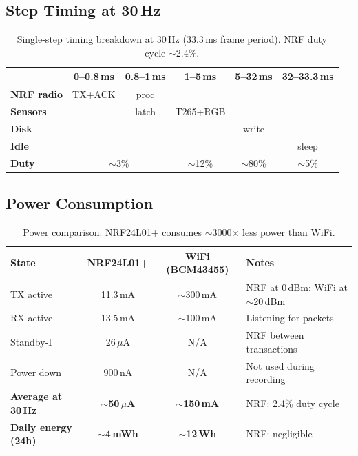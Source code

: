 \documentclass[11pt,a4paper]{article}
\begin{document}
\subsection{Step Timing at 30\,Hz}

\begin{table}[htbp]
\centering
\caption{Single-step timing breakdown at 30\,Hz (33.3\,ms frame period). NRF duty cycle ${\sim}$2.4\%.}
\setlength{\tabcolsep}{4pt}
\begin{tabular}{l c c c c c}
\toprule
 & 0--0.8\,ms & 0.8--1\,ms & 1--5\,ms & 5--32\,ms & 32--33.3\,ms \\
\midrule
\textbf{NRF radio} & \cellcolor{nodered}TX+ACK & \cellcolor{nodered}proc & & & \\
\textbf{Sensors} & & \cellcolor{nodeblue}latch & \cellcolor{nodeblue}T265+RGB & & \\
\textbf{Disk} & & & & \cellcolor{nodegreen}write & \\
\textbf{Idle} & & & & & \cellcolor{black!8}sleep \\
\midrule
\textbf{Duty} & \multicolumn{2}{c}{\cellcolor{nodeyellow}${\sim}$3\%} & \cellcolor{nodeyellow}${\sim}$12\% & \cellcolor{nodeyellow}${\sim}$80\% & \cellcolor{nodeyellow}${\sim}$5\% \\
\bottomrule
\end{tabular}
\label{tab:step-timing}
\end{table}

\subsection{Power Consumption}

\begin{table}[htbp]
\centering
\caption{Power comparison. NRF24L01+ consumes ${\sim}$3000$\times$ less power than WiFi.}
\begin{tabular}{l c c l}
\toprule
\textbf{State} & \textbf{NRF24L01+} & \textbf{WiFi (BCM43455)} & \textbf{Notes} \\
\midrule
TX active & 11.3\,mA & ${\sim}$300\,mA & NRF at 0\,dBm; WiFi at ${\sim}$20\,dBm \\
RX active & 13.5\,mA & ${\sim}$100\,mA & Listening for packets \\
Standby-I & 26\,$\mu$A & N/A & NRF between transactions \\
Power down & 900\,nA & N/A & Not used during recording \\
\midrule
\textbf{Average at 30\,Hz} & \textbf{${\sim}$50\,$\mu$A} & \textbf{${\sim}$150\,mA} & NRF: 2.4\% duty cycle \\
\textbf{Daily energy (24h)} & \textbf{${\sim}$4\,mWh} & \textbf{${\sim}$12\,Wh} & NRF: negligible \\
\bottomrule
\end{tabular}
\label{tab:power}
\end{table}
\end{document}
